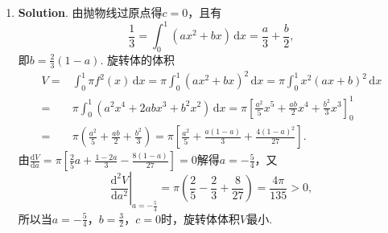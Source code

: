 \documentclass[../main.tex]{subfiles}
\begin{document}
\begin{enumerate}
    \item \textbf{Solution}. 由抛物线过原点得$c=0$，且有
          \[
              \frac{1}{3}=\int_{0}^{1}\left(ax^{2}+bx\right)\,\mathrm{d}x=\frac{a}{3}+\frac{b}{2}
              ,
          \]
          即$b=\frac{2}{3}(1-a)$. 旋转体的体积
          \[
              \begin{aligned}
                  V = {} & \int_{0}^{1}\pi f^{2}(x)\,\mathrm{d}x = \pi\int_{0}^{1}\left(ax^{2}+bx\right)^{2}\,\mathrm{d}x = \pi\int_{0}^{1}x^{2}(ax+b)^{2}\,\mathrm{d}x   \\
                  = {}   & \pi\int_{0}^{1}(a^{2}x^{4}+2abx^{3}+b^{2}x^{2})\,\mathrm{d}x = \pi\left[\frac{a^2}{5}x^{5}+\frac{ab}{2}x^{4}+\frac{b^2}{3}x^{3}\right]_{0}^{1} \\
                  = {}   & \pi\left(\frac{a^2}{5}+\frac{ab}{2}+\frac{b^2}{3}\right) = \pi\left[\frac{a^2}{5}+\frac{a(1-a)}{3}+\frac{4(1-a)^2}{27}\right].
              \end{aligned}
          \]
          由$\frac{\mathrm{d}V}{\mathrm{d}a}=\pi\left[\frac{2}{5}a+\frac{1-2a}{3}-\frac{8(1-a)}{27}
                  \right]=0$解得$a=-\frac{5}{4}$，又
          \[
              \left.\frac{\mathrm{d}^{2}V}{\mathrm{d}a^{2}}
              \right|_{a=-\frac{5}{4}}=\pi\left(\frac{2}{5}-\frac{2}{3}+\frac{8}{27}\right
              )=\frac{4\pi}{135}>0,
          \]
          所以当$a=-\frac{5}{4}$，$b=\frac{3}{2}$，$c=0$时，旋转体体积$V$最小.
\end{enumerate}
\end{document}
